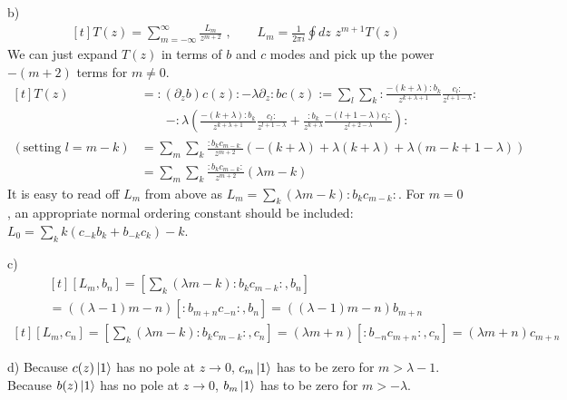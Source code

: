 \documentclass[12pt]{article}
\begin{document}
\begin{paragraph}{b)}
\begin{equation}
\begin{aligned}[t]
T(z)=\sum\limits_{m=-\infty}^{\infty}\frac{L_m}{z^{m+2}}\,\, ,\qquad L_m=\frac{1}{2\pi i}\oint dz \,\, z^{m+1}T(z)
\end{aligned}
\end{equation}
We can just expand $T(z)$ in terms of $b$ and $c$ modes and pick up the power $-(m+2)$ terms for $m\neq 0$.
\begin{equation}
\begin{aligned}[t]
T(z)&= : (\partial_z b) c(z): - \lambda \partial_z : b c (z):=\sum\limits_l\sum\limits_k :\frac{-(k+\lambda):b_k}{z^{k+\lambda+1}}\frac{c_l:}{z^{l+1-\lambda}}:\\
&\qquad-:\lambda(\frac{-(k+\lambda):b_k}{z^{k+\lambda+1}}\frac{c_l:}{z^{l+1-\lambda}}+\frac{:b_k}{z^{k+\lambda}}\frac{-(l+1-\lambda)c_l:}{z^{l+2-\lambda}}):\\
(\text{setting  }l=m-k)&=\sum\limits_{m}\sum\limits_{k}\frac{:b_k c_{m-k:}}{z^{m+2}}(-(k+\lambda)+\lambda(k+\lambda)+\lambda(m-k+1-\lambda))\\
&=\sum\limits_{m}\sum\limits_{k}\frac{:b_k c_{m-k}:}{z^{m+2}}(\lambda  m-k)
\end{aligned}
\end{equation}
It is easy to read off $L_m$ from above as $L_m=\sum\limits_{k}(\lambda  m-k):b_k c_{m-k}:$. For $m=0$, an appropriate normal ordering constant should be included: $L_0=\sum\limits_{k}  k(c_{-k}b_k+b_{-k}c_k) -k$. 
\end{paragraph}
\begin{paragraph}{c)}
\begin{equation}
\begin{aligned}[t]
[L_m,b_n]=[\sum\limits_{k}(\lambda  m-k):b_k c_{m-k}:,b_n]\\
=((\lambda-1)m-n)[:b_{m+n}c_{-n}:,b_n]=((\lambda-1)m-n)b_{m+n}
\end{aligned}
\end{equation}
\begin{equation}
\begin{aligned}[t]
[L_m,c_n]=[\sum\limits_{k}(\lambda  m-k):b_k c_{m-k}:,c_n]=(\lambda m+n)[:b_{-n}c_{m+n}:,c_n]=(\lambda m+n)c_{m+n}
\end{aligned}
\end{equation}
\end{paragraph}
\begin{paragraph}{d)}
Because $c(z)\ket{1}$ has no pole at $z\to 0$, $c_m\ket{1}$ has to be zero for $m>\lambda-1$. Because $b(z)\ket{1}$ has no pole at $z\to 0$, $b_m\ket{1}$ has to be zero for $m>-\lambda$.
\end{paragraph}
\end{document}
